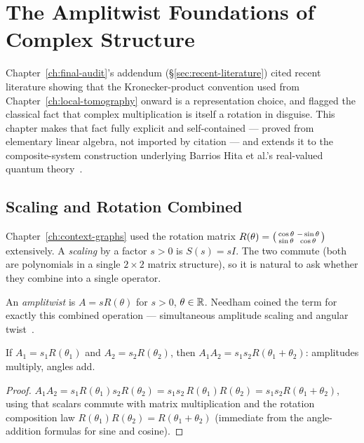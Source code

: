 \chapter{The Amplitwist Foundations of Complex Structure}
\label{ch:amplitwist}

Chapter~\ref{ch:final-audit}'s addendum (\S\ref{sec:recent-literature}) cited
recent literature showing that the Kronecker-product convention used from
Chapter~\ref{ch:local-tomography} onward is a representation choice, and
flagged the classical fact that complex multiplication is itself a rotation
in disguise. This chapter makes that fact fully explicit and self-contained
— proved from elementary linear algebra, not imported by citation — and
extends it to the composite-system construction underlying
Barrios Hita et al.'s real-valued quantum theory~\cite{barrios-hita-2026}.

\section{Scaling and Rotation Combined}

Chapter~\ref{ch:context-graphs} used the rotation matrix $R(\theta) =
\begin{psmallmatrix}\cos\theta & -\sin\theta\\ \sin\theta &
\cos\theta\end{psmallmatrix}$ extensively. A \emph{scaling} by a factor
$s>0$ is $S(s) = sI$. The two commute (both are polynomials in a single
$2\times2$ matrix structure), so it is natural to ask whether they combine
into a single operator.

\begin{definition}[Amplitwist]
An \emph{amplitwist} is $A = sR(\theta)$ for $s>0$, $\theta\in\mathbb{R}$. Needham
coined the term for exactly this combined operation — simultaneous
amplitude scaling and angular twist~\cite{needham1997}.
\end{definition}

\begin{theorem}
\label{thm:amplitwist-composition}
If $A_1 = s_1R(\theta_1)$ and $A_2 = s_2R(\theta_2)$, then $A_1A_2 =
s_1s_2R(\theta_1+\theta_2)$: amplitudes multiply, angles add.
\end{theorem}

\begin{proof}
$A_1A_2 = s_1R(\theta_1)s_2R(\theta_2) = s_1s_2\,R(\theta_1)R(\theta_2) =
s_1s_2R(\theta_1+\theta_2)$, using that scalars commute with matrix
multiplication and the rotation composition law $R(\theta_1)R(\theta_2) =
R(\theta_1+\theta_2)$ (immediate from the angle-addition formulas for sine
and cosine).
\end{proof}


